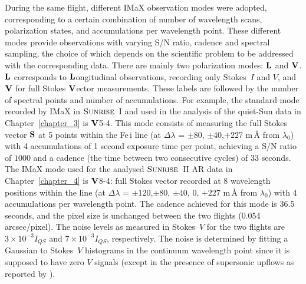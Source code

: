 \documentclass[goettingen, gauss, print]{thesis}
\begin{document}
During the same flight, different IMaX observation modes were adopted, corresponding to a certain combination of number of wavelength scans, polarization states, and accumulations per wavelength point. These different modes provide observations with varying S/N ratio, cadence and spectral sampling, the choice of which depends on the scientific problem to be addressed with the corresponding data. There are mainly two polarization modes: {$\bf{L}$} and {$\bf{V}$}. {$\bf{L}$} corresponds to {$\bf{L}$}ongitudinal observations, recording only Stokes~$I$ and $V$, and {$\bf{V}$} for full Stokes {$\bf{V}$}ector measurements. These labels are followed by the number of spectral points and number of accumulations. For example, the standard mode recorded by IMaX in $\textsc{Sunrise}$~I and used in the analysis of the quiet-Sun data in Chapter~\ref{chapter_3} is $\bf{V}$5-4. This mode consists of measuring the full Stokes vector {$\bf{S}$} at 5 points within the Fe\,{\sc i} line (at $\Delta\lambda$ = $\pm80$, $\pm40$,$+227$ m\,\AA{} from $\lambda_0$) with 4 accumulations of 1 second exposure time per point, achieving a S/N ratio of $1000$ and a cadence (the time between two consecutive cycles) of $33$ seconds. The IMaX mode used for the analysed $\textsc{Sunrise}$~II AR data in Chapter~\ref{chapter_4} is $\bf{V}$8-4: full Stokes vector recorded at 8 wavelength positions within the line (at $\Delta\lambda$ = $\pm120$,$\pm80$, $\pm40$, $0$, $+227$ m\,\AA{} from $\lambda_0$) with 4 accumulations per wavelength point. The cadence achieved for this mode is 36.5 seconds, and the pixel size is unchanged between the two flights (0.054 arcsec/pixel). The noise levels as measured in Stokes~$V$ for the two flights are $3\times10^{-3}I_{QS}$ and $7\times 10^{-3}I_{QS}$, respectively. The noise is determined by fitting a Gaussian to Stokes~$V$ histograms in the continuum wavelength point since it is supposed to have zero $V$ signals (except in the presence of supersonic upflows as reported by \cite{borrero_supersonic_2010}).
\end{document}
